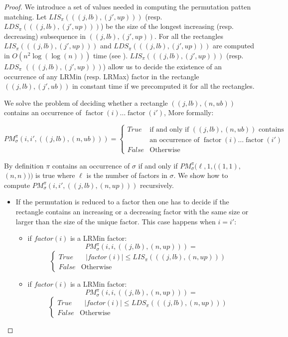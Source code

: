 \documentclass[a4paper]{llncs}
\newcommand{\ptext}{\pi}
\newcounter{num}
\newcommand{\PM}{PM}
\DeclareMathOperator{\factor}{factor}
\begin{document}
\begin{proof}
We introduce a set of values needed in computing the permutation patten matching.
Let $LIS_{\ptext}(((j,lb),(j',up)))$ (resp. $LDS_{\ptext}(((j,lb),(j',up)))$) be the size of the longest increasing
(resp. decreasing) subsequence in $((j,lb),(j',up))$.
For all the rectangles
$LIS_{\ptext}(((j,lb),(j',up)))$ and $LDS_{\ptext}(((j,lb),(j',up)))$ are computed in
$O(n^2\log(\log(n)))$ time (see \cite{Bespamyatnikh00enumeratinglongest}).
$LIS_{\ptext}(((j,lb),(j',up)))$
(resp. $LDS_{\ptext}$ $(((j,lb),(j',up)))$)
allow us to decide
the existence of an occurrence of any LRMin (resp. LRMax) factor
in the rectangle $((j,lb),(j',ub))$ in constant time
if we precomputed it for all the rectangles.


We solve the problem of deciding whether
a rectangle $((j,lb),(n,ub))$ contains
an occurrence of $\factor(i)\ldots\factor(i')$,
More formally:

$$
\PM^\pi_\sigma(i,i',((j,lb),(n,ub))) =
\begin{cases}
True & \text{if and only if $((j,lb),(n,ub))$ contains } \\
 & \text{an occurrence of $\factor(i)\ldots\factor(i')$}\\
 False & \text{Otherwise}
\end{cases}
$$

By definition $\pi$ contains an occurrence of $\sigma$
if and only if $\PM^\pi_\sigma(\ell,1,((1,1),$ $(n,n)))$
is true
where $\ell$ is the number of factors in $\sigma$.
We show how to compute $\PM^\pi_\sigma(i,i',((j,lb),(n,up)))$ recursively.
\begin{itemize}
\item If the permutation is reduced to a factor
then one has to decide if the rectangle
contains an increasing or a decreasing factor
with the same size or larger than the
size of the unique factor.
This case happens when $i=i'$:
\begin{itemize}
\item if $factor(i)$ is a LRMin factor:
$$
\PM^\pi_\sigma(i,i,((j,lb),(n,up))) =
$$
$$
\begin{cases}
True & \text{ $|factor(i)| \leq LIS_{\ptext}(((j,lb),(n,up)))$ } \\
False & \text{Otherwise}
\end{cases}
$$
\item if $factor(i)$ is a LRMin factor:
$$
\PM^\pi_\sigma(i,i,((j,lb),(n,up))) =
$$
$$
\begin{cases}
True & \text{ $|factor(i)| \leq LDS_{\ptext}(((j,lb),(n,up)))$ } \\
False & \text{Otherwise}
\end{cases}
$$
\end{itemize}



\end{itemize}
\end{proof}
\end{document}
